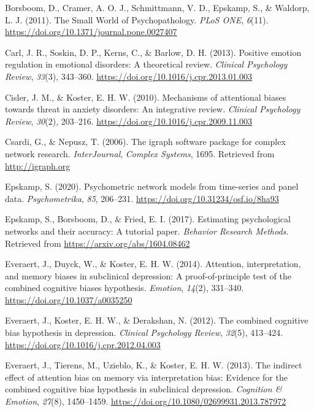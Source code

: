 \documentclass[
  english,
  man,floatsintext]{apa6}
\begin{document}
\leavevmode\hypertarget{ref-borsboom_small_2011}{}%
Borsboom, D., Cramer, A. O. J., Schmittmann, V. D., Epskamp, S., \& Waldorp, L. J. (2011). The Small World of Psychopathology. \emph{PLoS ONE}, \emph{6}(11). \url{https://doi.org/10.1371/journal.pone.0027407}

\leavevmode\hypertarget{ref-Carl2013}{}%
Carl, J. R., Soskin, D. P., Kerns, C., \& Barlow, D. H. (2013). Positive emotion regulation in emotional disorders: A theoretical review. \emph{Clinical Psychology Review}, \emph{33}(3), 343--360. \url{https://doi.org/10.1016/j.cpr.2013.01.003}

\leavevmode\hypertarget{ref-Cisler2010a}{}%
Cisler, J. M., \& Koster, E. H. W. (2010). Mechanisms of attentional biases towards threat in anxiety disorders: An integrative review. \emph{Clinical Psychology Review}, \emph{30}(2), 203--216. \url{https://doi.org/10.1016/j.cpr.2009.11.003}

\leavevmode\hypertarget{ref-R-igraph}{}%
Csardi, G., \& Nepusz, T. (2006). The igraph software package for complex network research. \emph{InterJournal}, \emph{Complex Systems}, 1695. Retrieved from \url{http://igraph.org}

\leavevmode\hypertarget{ref-epskamp_psychometric_2020}{}%
Epskamp, S. (2020). Psychometric network models from time-series and panel data. \emph{Psychometrika}, \emph{85}, 206--231. \url{https://doi.org/10.31234/osf.io/8ha93}

\leavevmode\hypertarget{ref-R-bootnet}{}%
Epskamp, S., Borsboom, D., \& Fried, E. I. (2017). Estimating psychological networks and their accuracy: A tutorial paper. \emph{Behavior Research Methods}. Retrieved from \url{https://arxiv.org/abs/1604.08462}

\leavevmode\hypertarget{ref-Everaert2014}{}%
Everaert, J., Duyck, W., \& Koster, E. H. W. (2014). Attention, interpretation, and memory biases in subclinical depression: A proof-of-principle test of the combined cognitive biases hypothesis. \emph{Emotion}, \emph{14}(2), 331--340. \url{https://doi.org/10.1037/a0035250}

\leavevmode\hypertarget{ref-everaert_combined_2012}{}%
Everaert, J., Koster, E. H. W., \& Derakshan, N. (2012). The combined cognitive bias hypothesis in depression. \emph{Clinical Psychology Review}, \emph{32}(5), 413--424. \url{https://doi.org/10.1016/j.cpr.2012.04.003}

\leavevmode\hypertarget{ref-Everaert2013}{}%
Everaert, J., Tierens, M., Uzieblo, K., \& Koster, E. H. W. (2013). The indirect effect of attention bias on memory via interpretation bias: Evidence for the combined cognitive bias hypothesis in subclinical depression. \emph{Cognition \& Emotion}, \emph{27}(8), 1450--1459. \url{https://doi.org/10.1080/02699931.2013.787972}
\end{document}

